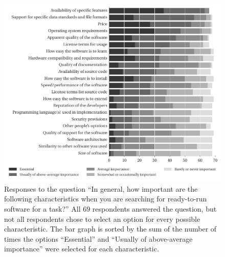 \documentclass{casicswhitepaper}
\newcommand{\totalRespondents}{69\xspace}
\begin{document}
\begin{figure}[bht]
  \centering
  \hspace*{-1ex}%
  \includegraphics{files/plots/bar-graph-criteria-ready-to-run.pdf}
  \vspace*{-4ex}
  \caption{Responses to the question ``In general, how important are the following characteristics when you are searching for ready-to-run software for a task?''  All \totalRespondents respondents answered the question, but not all respondents chose to select an option for every possible characteristic.  The bar graph is sorted by the sum of the number of times the options ``Essential'' and ``Usually of above-average importance'' were selected for each characteristic.}
  \label{criteria-ready-to-run}
\end{figure}


\end{document}
